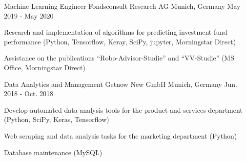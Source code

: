 \begin{cventries}

\cventry
{Machine Learning Engineer} %
{Fondsconsult Research AG} %
{Munich, Germany} %
{May 2019 - May 2020} %
{ %
\begin{cvitems}
\item {Research and implementation of algorithms for predicting  investment fund performance (Python, Tensorflow, Keray, SciPy, jupyter, Morningstar Direct)}
\item {Assistance on the publications ``Robo-Advisor-Studie'' and ``VV-Studie'' (MS Office, Morningstar Direct)}
\end{cvitems}
}


\cventry
{Data Analytics and Management} %
{Getnow New GmbH} %
{Munich, Germany} %
{Jun. 2018 - Oct. 2018} %
{ %
\begin{cvitems}
\item {Develop automated data analysis tools for the product and services department (Python, SciPy, Keras, Tensorflow)}
\item {Web scraping and data analysis tasks for the marketing department (Python)}
\item {Database maintenance (MySQL)}
\end{cvitems}
}

\end{cventries}